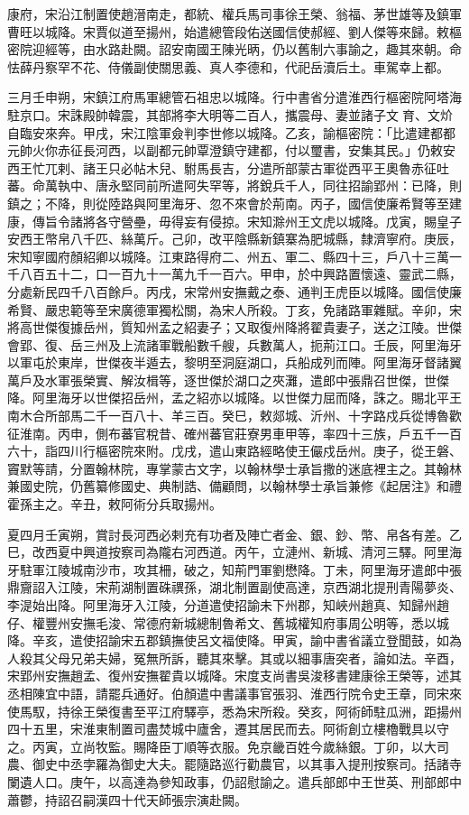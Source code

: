 \begin{pinyinscope}
康府，宋沿江制置使趙溍南走，都統、權兵馬司事徐王榮、翁福、茅世雄等及鎮軍曹旺以城降。宋賈似道至揚州，始遣總管段佑送國信使郝經、劉人傑等來歸。敕樞密院迎經等，由水路赴闕。詔安南國王陳光昞，仍以舊制六事諭之，趣其來朝。命怯薛丹察罕不花、侍儀副使關思義、真人李德和，代祀岳瀆后土。車駕幸上都。



 三月壬申朔，宋鎮江府馬軍總管石祖忠以城降。行中書省分遣淮西行樞密院阿塔海駐京口。宋誅殿帥韓震，其部將李大明等二百人，攜震母、妻並諸子文育、文炌自臨安來奔。甲戌，宋江陰軍僉判李世修以城降。乙亥，諭樞密院：「比遣建都都元帥火你赤征長河西，以副都元帥覃澄鎮守建都，付以璽書，安集其民。」仍敕安西王忙兀剌、諸王只必帖木兒、駙馬長吉，分遣所部蒙古軍從西平王奧魯赤征吐蕃。命萬執中、唐永堅同前所遣阿失罕等，將銳兵千人，同往招諭郢州：已降，則鎮之；不降，則從陸路與阿里海牙、忽不來會於荊南。丙子，國信使廉希賢等至建康，傳旨令諸將各守營壘，毋得妄有侵掠。宋知滁州王文虎以城降。戊寅，賜皇子安西王幣帛八千匹、絲萬斤。己卯，改平陰縣新鎮寨為肥城縣，隸濟寧府。庚辰，宋知寧國府顏紹卿以城降。江東路得府二、州五、軍二、縣四十三，戶八十三萬一千八百五十二，口一百九十一萬九千一百六。甲申，於中興路置懷遠、靈武二縣，分處新民四千八百餘戶。丙戌，宋常州安撫戴之泰、通判王虎臣以城降。國信使廉希賢、嚴忠範等至宋廣德軍獨松關，為宋人所殺。丁亥，免諸路軍雜賦。辛卯，宋將高世傑復據岳州，質知州孟之紹妻子；又取復州降將翟貴妻子，送之江陵。世傑會郢、復、岳三州及上流諸軍戰船數千艘，兵數萬人，扼荊江口。壬辰，阿里海牙以軍屯於東岸，世傑夜半遁去，黎明至洞庭湖口，兵船成列而陣。阿里海牙督諸翼萬戶及水軍張榮實、解汝楫等，逐世傑於湖口之夾灘，遣郎中張鼎召世傑，世傑降。阿里海牙以世傑招岳州，孟之紹亦以城降。以世傑力屈而降，誅之。賜北平王南木合所部馬二千一百八十、羊三百。癸巳，敕郯城、沂州、十字路戍兵從博魯歡征淮南。丙申，側布蕃官稅昔、確州蕃官莊寮男車甲等，率四十三族，戶五千一百六十，詣四川行樞密院來附。戊戌，遣山東路經略使王儼戍岳州。庚子，從王磐、竇默等請，分置翰林院，專掌蒙古文字，以翰林學士承旨撒的迷底裡主之。其翰林兼國史院，仍舊纂修國史、典制誥、備顧問，以翰林學士承旨兼修《起居注》和禮霍孫主之。辛丑，敕阿術分兵取揚州。



 夏四月壬寅朔，賞討長河西必剌充有功者及陣亡者金、銀、鈔、幣、帛各有差。乙巳，改西夏中興道按察司為隴右河西道。丙午，立漣州、新城、清河三驛。阿里海牙駐軍江陵城南沙市，攻其柵，破之，知荊門軍劉懋降。丁未，阿里海牙遣郎中張鼎齎詔入江陵，宋荊湖制置硃禩孫，湖北制置副使高達，京西湖北提刑青陽夢炎、李湜始出降。阿里海牙入江陵，分道遣使招諭未下州郡，知峽州趙真、知歸州趙仔、權豐州安撫毛浚、常德府新城總制魯希文、舊城權知府事周公明等，悉以城降。辛亥，遣使招諭宋五郡鎮撫使呂文福使降。甲寅，諭中書省議立登聞鼓，如為人殺其父母兄弟夫婦，冤無所訴，聽其來擊。其或以細事唐突者，論如法。辛酉，宋郢州安撫趙孟、復州安撫翟貴以城降。宋度支尚書吳浚移書建康徐王榮等，述其丞相陳宜中語，請罷兵通好。伯顏遣中書議事官張羽、淮西行院令史王章，同宋來使馬馭，持徐王榮復書至平江府驛亭，悉為宋所殺。癸亥，阿術師駐瓜洲，距揚州四十五里，宋淮東制置司盡焚城中廬舍，遷其居民而去。阿術創立樓櫓戰具以守之。丙寅，立尚牧監。賜降臣丁順等衣服。免京畿百姓今歲絲銀。丁卯，以大司農、御史中丞孛羅為御史大夫。罷隨路巡行勸農官，以其事入提刑按察司。括諸寺闌遺人口。庚午，以高達為參知政事，仍詔慰諭之。遣兵部郎中王世英、刑部郎中蕭鬱，持詔召嗣漢四十代天師張宗演赴闕。




\end{pinyinscope}
